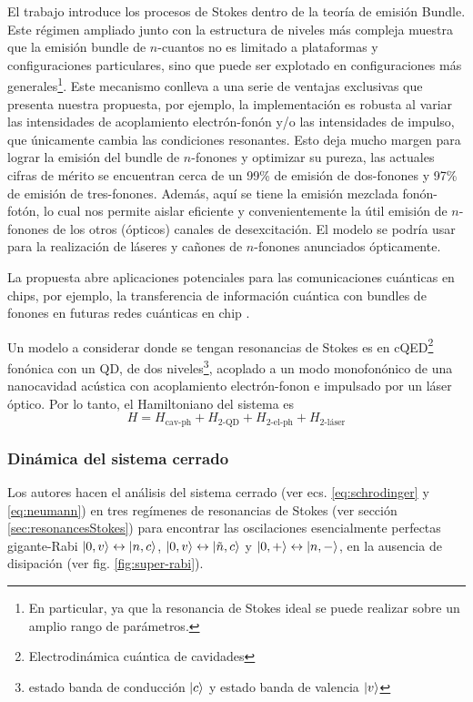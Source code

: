 \documentclass[../main.tex]{subfiles}
\begin{document}
El trabajo introduce los procesos de Stokes dentro de la teoría de emisión Bundle. Este régimen ampliado junto con la estructura de niveles más compleja muestra que la emisión bundle de $n$-cuantos no es limitado a plataformas y configuraciones particulares, sino que puede ser explotado en configuraciones más generales\footnote{En particular, ya que la resonancia de Stokes ideal se puede realizar sobre un amplio rango de parámetros.}. Este mecanismo conlleva a una serie de ventajas exclusivas que presenta nuestra propuesta, por ejemplo, la implementación es robusta al variar las intensidades de acoplamiento electrón-fonón y/o las intensidades de impulso, que únicamente cambia las condiciones resonantes. Esto deja mucho margen para lograr la emisión del bundle de $n$-fonones y optimizar su pureza, las actuales cifras de mérito \parencite{Stock2011} se encuentran cerca de un 99\% de emisión de dos-fonones y 97\% de emisión de tres-fonones. Además, aquí se tiene la emisión mezclada fonón-fotón, lo cual nos permite aislar eficiente y convenientemente la útil emisión de $n$-fonones de los otros (ópticos) canales de desexcitación. El modelo se podría usar para la realización de láseres y cañones de $n$-fonones anunciados ópticamente.

La propuesta abre aplicaciones potenciales para las comunicaciones cuánticas en chips, por ejemplo, la transferencia de información cuántica con bundles de fonones en futuras redes cuánticas en chip \parencite{Bienfait2019}.

Un modelo a considerar donde se tengan resonancias de Stokes es en cQED\footnote{Electrodinámica cuántica de cavidades} fonónica con un QD, de dos niveles\footnote{estado banda de conducción $\ket{c}$ y estado banda de valencia $\ket{v}$}, acoplado a un modo monofonónico de una nanocavidad acústica con acoplamiento electrón-fonon e impulsado por un láser óptico. Por lo tanto, el Hamiltoniano del sistema es
\begin{equation}
	H = H_\text{cav-ph} + H_\text{2-QD} + H_\text{2-el-ph} + H_\text{2-láser}
\end{equation}

\subsubsection{Dinámica del sistema cerrado}
Los autores hacen el análisis del sistema cerrado (ver ecs. \ref{eq:schrodinger} y \ref{eq:neumann}) en tres regímenes de resonancias de Stokes (ver sección \ref{sec:resonancesStokes}) para encontrar las oscilaciones esencialmente perfectas gigante-Rabi $\ket{0,v} \leftrightarrow \ket{n,c}$, $\ket{0,v} \leftrightarrow \ket{\tilde{n},c}$ y $\ket{0,+} \leftrightarrow \ket{n,-}$, en la ausencia de disipación (ver fig. \ref{fig:super-rabi}).
\end{document}
